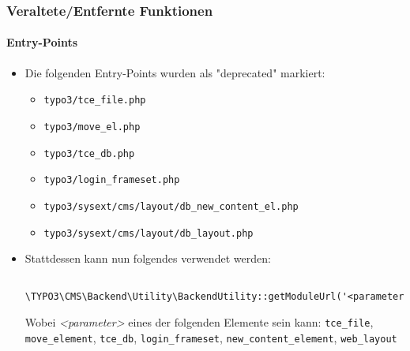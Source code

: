 \begin{frame}[fragile]
	\frametitle{Veraltete/Entfernte Funktionen}
	\framesubtitle{Entry-Points}

	\begin{itemize}
		\item Die folgenden Entry-Points wurden als "deprecated" markiert:

			\begin{itemize}
				\item \texttt{typo3/tce\_file.php}
				\item \texttt{typo3/move\_el.php}
				\item \texttt{typo3/tce\_db.php}
				\item \texttt{typo3/login\_frameset.php}
				\item \texttt{typo3/sysext/cms/layout/db\_new\_content\_el.php}
				\item \texttt{typo3/sysext/cms/layout/db\_layout.php}
			\end{itemize}

		\item Stattdessen kann nun folgendes verwendet werden:
			\begin{lstlisting}
				\TYPO3\CMS\Backend\Utility\BackendUtility::getModuleUrl('<parameter>')
			\end{lstlisting}

			Wobei \textit{<parameter>} eines der folgenden Elemente sein kann:\newline
				\small
					\texttt{tce\_file}, \texttt{move\_element}, \texttt{tce\_db},
					\texttt{login\_frameset}, \texttt{new\_content\_element}, \texttt{web\_layout}
				\normalsize
	\end{itemize}

\end{frame}


